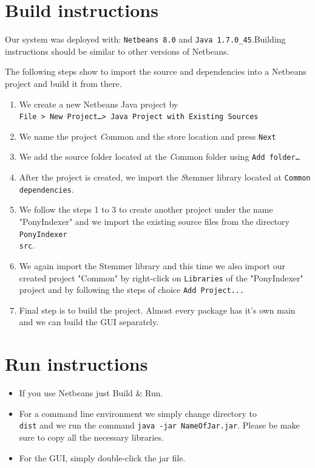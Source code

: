 \documentclass[letterpaper,twocolumn,10pt]{article}
\begin{document}
\section{Build instructions}
Our system was deployed with: {\tt Netbeans 8.0} and {\tt Java 1.7.0\_45}.Building instructions should be similar to other versions of Netbeans.

The following steps show to import the source and dependencies into a Netbeans project and build it from there.

\begin{enumerate}
	\item We create a new Netbeans Java project by \\
				{\tt File > New Project\ldots  > Java Project with Existing Sources }
	\item We name the project {\emph Common} and the store location and press
				{\tt Next}
	\item We add the source folder located at the {\emph Common} folder
				using {\tt Add folder\ldots}
	\item After the project is created, we import the {\emph Stemmer} library
				located at {\tt Common\\dependencies}.
	\item We follow the steps 1 to 3 to create another project under the name "PonyIndexer" and we import the existing source files from the directory {\tt PonyIndexer\\src}.
	\item We again import the Stemmer library and this time we also import our created project "Common" by right-click on {\tt Libraries} of the "PonyIndexer" project and by following the steps of choice {\tt Add Project...}
	\item Final step is to build the project. Almost every package has it's own main and we can build the GUI separately.
\end{enumerate}

\section{Run instructions}
\begin{itemize}
	\item If you use Netbeans just Build \& Run.
	\item For a command line environment we simply change directory to {\tt \\dist} and we run the command {\tt java -jar NameOfJar.jar}. Please be make sure to copy all the necessary libraries.
	\item For the GUI, simply double-click the jar file.
\end{itemize}
\end{document}
